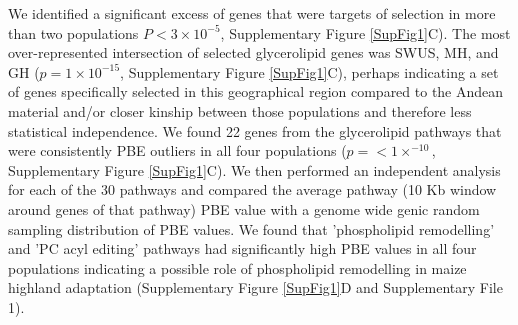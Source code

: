 \documentclass[9pt,twocolumn,twoside,lineno]{BioRxiv}
\begin{document}
We identified a significant excess of genes that were targets of selection in more than two populations $P< 3 \times 10^{-5}$, Supplementary Figure \ref{SupFig1}C).
The most over-represented intersection of selected glycerolipid genes was SWUS, MH, and GH ($p = 1  \times 10 ^{-15} $, Supplementary Figure \ref{SupFig1}C), perhaps indicating a set of genes specifically selected in this geographical region compared to the Andean material and/or closer kinship between those populations and therefore less statistical independence.
We found 22 genes from the glycerolipid pathways that were consistently PBE outliers in all four populations ($p =<1  \times  ^{-10}$, Supplementary Figure \ref{SupFig1}C). 
We then performed an independent analysis for each of the 30 pathways and compared the average pathway (10 Kb window around genes of that pathway) PBE value with a genome wide genic random sampling distribution of PBE values. 
We found that 'phospholipid remodelling'  and 'PC acyl editing'  pathways had significantly high PBE values in all four populations indicating a possible role of phospholipid remodelling in maize highland adaptation (Supplementary Figure \ref{SupFig1}D and Supplementary File 1). 
\end{document}

